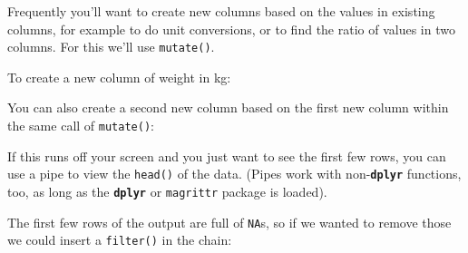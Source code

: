 \documentclass[]{book}
\newenvironment{Shaded}{\begin{snugshade}}{\end{snugshade}}
\newcommand{\KeywordTok}[1]{\textcolor[rgb]{0.13,0.29,0.53}{\textbf{#1}}}
\newcommand{\DataTypeTok}[1]{\textcolor[rgb]{0.13,0.29,0.53}{#1}}
\newcommand{\DecValTok}[1]{\textcolor[rgb]{0.00,0.00,0.81}{#1}}
\newcommand{\StringTok}[1]{\textcolor[rgb]{0.31,0.60,0.02}{#1}}
\newcommand{\OperatorTok}[1]{\textcolor[rgb]{0.81,0.36,0.00}{\textbf{#1}}}
\newcommand{\NormalTok}[1]{#1}
\begin{document}
Frequently you'll want to create new columns based on the values in
existing columns, for example to do unit conversions, or to find the
ratio of values in two columns. For this we'll use \texttt{mutate()}.

To create a new column of weight in kg:

\begin{Shaded}
\end{Shaded}

You can also create a second new column based on the first new column
within the same call of \texttt{mutate()}:

\begin{Shaded}
\end{Shaded}

If this runs off your screen and you just want to see the first few
rows, you can use a pipe to view the \texttt{head()} of the data. (Pipes
work with non-\textbf{\texttt{dplyr}} functions, too, as long as the
\textbf{\texttt{dplyr}} or \texttt{magrittr} package is loaded).

\begin{Shaded}
\end{Shaded}

The first few rows of the output are full of \texttt{NA}s, so if we
wanted to remove those we could insert a \texttt{filter()} in the chain:

\begin{Shaded}
\end{Shaded}
\end{document}
